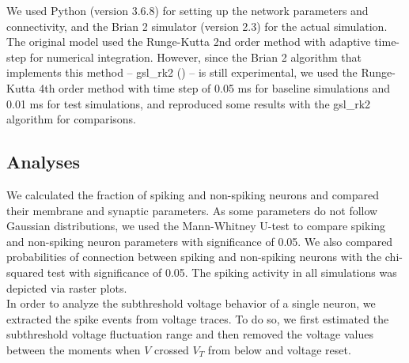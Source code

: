We used Python (version 3.6.8) for setting up the network parameters and connectivity, and the Brian 2 simulator (version 2.3)  for the actual simulation.  The original model used the Runge-Kutta 2nd order method with adaptive time-step for numerical integration. However, since the Brian 2 algorithm that implements this method -- gsl\_rk2 (\cite{gslrk2}) -- is still experimental, we used the Runge-Kutta 4th order method with time step of 0.05 ms for baseline simulations and 0.01 ms for test simulations, and reproduced some results with the gsl\_rk2 algorithm for comparisons. \\

\subsection*{Analyses}

We calculated the fraction of spiking and non-spiking neurons and compared their membrane and synaptic parameters. As some parameters do not follow Gaussian distributions, we used the Mann-Whitney U-test to compare spiking and non-spiking neuron parameters with significance of 0.05. We also compared probabilities of connection between spiking and non-spiking neurons with the chi-squared test with significance of 0.05. The spiking activity in all simulations was depicted via raster plots.\\

In order to analyze the subthreshold voltage behavior of a single neuron, we extracted the spike events from voltage traces. To do so, we first estimated the subthreshold voltage fluctuation range and then removed the voltage values between the moments when $V$ crossed $V_T$ from below and voltage reset.\\

